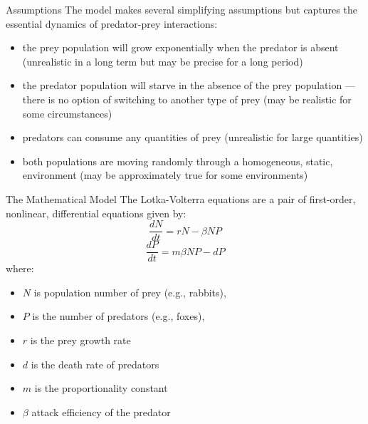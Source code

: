 \begin{frame}{Assumptions}
         The model makes several simplifying assumptions but captures the essential dynamics of predator-prey interactions:
        \begin{itemize}
         \pause
          \item  the prey population will grow exponentially when the predator is absent (unrealistic in a long term but may be precise for a long period) 
           \pause
          \item the predator population will starve in the absence of the prey population --- there is no option of  switching to another type of prey (may be realistic for some circumstances) 
           \pause
          \item predators can consume any quantities of prey (unrealistic for large quantities)
           \pause
          \item both populations are moving randomly through a homogeneous, static, environment (may be approximately true for some environments)
        \end{itemize}

\end{frame}

\begin{frame}{The Mathematical Model}
\small
    The Lotka-Volterra equations are a pair of first-order, nonlinear, differential equations given by:
    \begin{equation}
        \frac{dN}{dt} = rN - \beta NP
    \end{equation}
      \begin{equation}
        \frac{dP}{dt} = m\beta NP - dP
    \end{equation}
    \pause
    where:
    \begin{itemize}
        \item $N$ is population number of prey (e.g., rabbits),
            \pause
        \item $P$ is the number of predators (e.g., foxes),
        \item $r$ is the prey growth rate
            \pause
        \item $d$ is the death rate of predators
            \pause
        \item $m$ is the proportionality constant
            \pause
        \item $\beta$ attack efficiency of the predator
    \end{itemize}
\end{frame}


